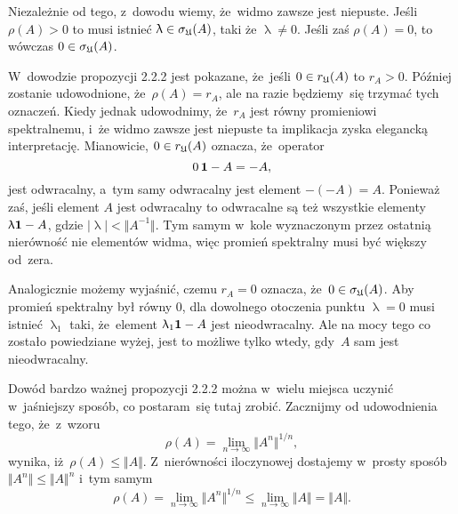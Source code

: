 \documentclass[a4paper,11pt]{article}
\numberwithin{equation}{section}
\renewcommand{\lambda}{\uplambda}
\begin{document}
Niezależnie od tego, z~dowodu wiemy, że~widmo zawsze jest niepuste. Jeśli
$\rho( A ) > 0$ to musi istnieć $\lambda \in \sigma_{ \Ufrak }( A )$, taki że $\lambda \neq 0$. Jeśli
zaś $\rho( A ) = 0$, to wówczas $0 \in \sigma_{ \mathfrak{U} }( A )$.

\VerSpaceFour





\noindent
{} W~dowodzie propozycji 2.2.2 jest pokazane, że~jeśli
$0 \in r_{ \mathfrak{U} }( A )$ to $r_{ A } > 0$. Później zostanie udowodnione,
że~$\rho( A ) = r_{ A }$, ale na razie będziemy~się trzymać tych oznaczeń.
Kiedy jednak udowodnimy, że~$r_{ A }$ jest równy promieniowi spektralnemu,
i~że widmo zawsze jest niepuste ta implikacja zyska elegancką interpretację.
Mianowicie, $0 \in r_{ \mathfrak{U} }( A )$ oznacza, że~operator
\begin{equation}
  \label{eq:Bratteli-Robinson-Operator-Algebras-ETC-Vol-I-s01-39}
  0 \, \mathbf{1} - A = -A,
\end{equation}
jest odwracalny, a~tym samy odwracalny jest element $-( -A ) = A$. Ponieważ
zaś, jeśli element $A$ jest odwracalny to odwracalne są też wszystkie
elementy $\lambda \UnitAlg - A$, gdzie $| \lambda | < \Vert A^{ -1 } \Vert$. Tym samym w~kole
wyznaczonym przez ostatnią nierówność nie elementów widma, więc promień
spektralny musi być większy od~zera.

Analogicznie możemy wyjaśnić, czemu $r_{ A } = 0$ oznacza,
że~$0 \in \sigma_{ \mathfrak{U} }( A )$. Aby promień spektralny był równy $0$, dla
dowolnego otoczenia punktu $\lambda = 0$ musi istnieć $\lambda_{ 1 }$ taki,
że~element $\lambda_{ 1 } \UnitAlg - A$ jest nieodwracalny. Ale na mocy tego co
zostało powiedziane wyżej, jest to możliwe tylko wtedy, gdy~$A$ sam jest
nieodwracalny.

\VerSpaceFour





\noindent
{} Dowód bardzo ważnej propozycji 2.2.2 można w~wielu miejsca
uczynić w~jaśniejszy sposób, co postaram~się tutaj zrobić. Zacznijmy od
udowodnienia tego, że~z~wzoru
\begin{equation}
  \label{eq:Bratteli-Robinson-Operator-Algebras-ETC-Vol-I-s01-40}
  \rho( A ) = \lim_{ n \to \infty } \Vert A^{ n } \Vert^{ 1 / n },
\end{equation}
wynika, iż~$\rho( A ) \leq \Vert A \Vert$. Z~nierówności iloczynowej dostajemy w~prosty
sposób $\Vert A^{ n } \Vert \leq \Vert A \Vert^{ n }$ i~tym samym
\begin{equation}
  \label{eq:Bratteli-Robinson-Operator-Algebras-ETC-Vol-I-s01-41}
  \rho( A ) =
  \lim_{ n \to \infty } \Vert A^{ n } \Vert^{ 1 / n } \leq
  \lim_{ n \to \infty } \Vert A \Vert = \Vert A \Vert.
\end{equation}
\end{document}
